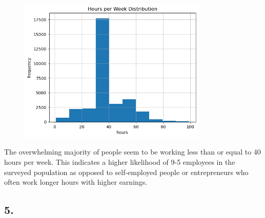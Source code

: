 \documentclass{article}
\begin{document}
    \newpage
    \begin{center}
        \begin{minipage}[t]{0.9\textwidth}
            \begin{figure}[H]
                \centering
                \includegraphics[width=0.8\textwidth, height=0.4\textheight]{./1_4c.png}
            \end{figure}
            The overwhelming majority of people seem to be working less than or
            equal to 40 hours per week. This indicates a higher likelihood of 9-5
            employees in the surveyed population as opposed to self-employed
            people or entrepreneurs who often work longer hours with higher earnings. 
        \end{minipage}
    \end{center}
    
    \subsection*{5.}
    
\end{document}
